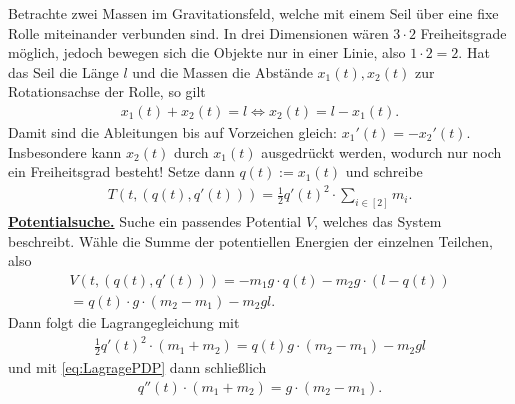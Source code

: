 \documentclass[../WiSe22ANA3.tex]{subfiles}
\begin{document}
 		\begin{bsp}
 			Betrachte zwei Massen im Gravitationsfeld, welche mit einem Seil über eine fixe Rolle miteinander verbunden sind. In drei Dimensionen wären $3\cdot 2$ Freiheitsgrade möglich, jedoch bewegen sich die Objekte nur in einer Linie, also $1\cdot 2=2$. Hat das Seil die Länge $l$ und die Massen die Abstände $x_1(t),x_2(t)$ zur Rotationsachse der Rolle, so gilt 
 			\begin{align*}
 				x_1(t)+x_2(t)=l\Longleftrightarrow x_2(t)=l-x_1(t). 
 			\end{align*}
 			Damit sind die Ableitungen bis auf Vorzeichen gleich: $x_1'(t)=-x_2'(t)$. Insbesondere kann $x_2(t)$ durch $x_1(t)$ ausgedrückt werden, wodurch nur noch ein Freiheitsgrad besteht! Setze dann $q(t):=x_1(t)$ und schreibe
 			\begin{align*}
 				T(t,(q(t),q'(t)))=\frac{1}{2}q'(t)^2\cdot\sum_{i\in[2]}m_i.
 			\end{align*}
 			\underline{\textbf{Potentialsuche.}} Suche ein passendes Potential $V$, welches das System beschreibt. Wähle die Summe der potentiellen Energien der einzelnen Teilchen, also
 			\begin{multline*}
 				V(t,(q(t),q'(t)))=-m_1g\cdot q(t)-m_2g\cdot (l-q(t)) \\
 				=q(t)\cdot g\cdot (m_2-m_1)-m_2gl.
 			\end{multline*}
 			Dann folgt die Lagrangegleichung mit
 			\begin{align*}
 				\frac{1}{2}q'(t)^2\cdot(m_1+m_2)=q(t)g\cdot(m_2-m_1)-m_2gl
 			\end{align*}
 			und mit \eqref{eq:LagragePDP} dann schließlich
 			\begin{align*}
 				q''(t)\cdot(m_1+m_2)=g\cdot(m_2-m_1).
 			\end{align*}
  		\end{bsp}
  	
\end{document}
